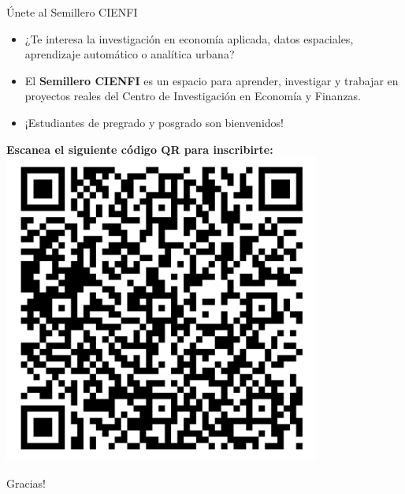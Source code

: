 \documentclass{beamer}
\begin{document}
\begin{frame}{Únete al Semillero CIENFI}
\vspace{0.5em}
\begin{itemize}
    \item ¿Te interesa la investigación en economía aplicada, datos espaciales, aprendizaje automático o analítica urbana?
    \item El \textbf{Semillero CIENFI} es un espacio para aprender, investigar y trabajar en proyectos reales del Centro de Investigación en Economía y Finanzas.
    \item ¡Estudiantes de pregrado y posgrado son bienvenidos!
\end{itemize}
\centering
\textbf{Escanea el siguiente código QR para inscribirte:} \\
\includegraphics[width=0.38\linewidth]{figures/qr.png}
\end{frame}

\begin{frame}
    \begin{center}
    \Huge Gracias!
    \end{center}
\end{frame}
\end{document}
